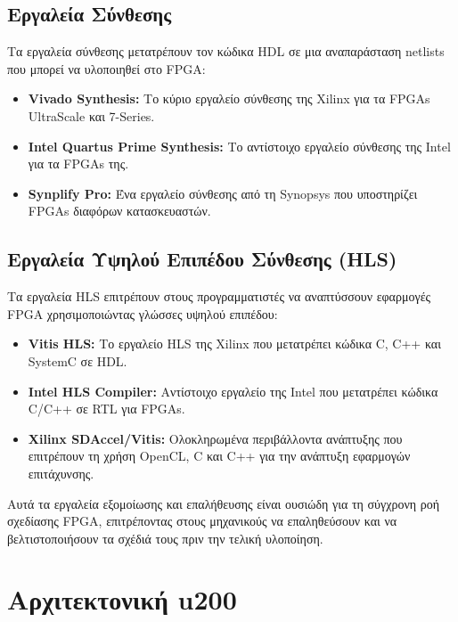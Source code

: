 \subsection{Εργαλεία Σύνθεσης}

Τα εργαλεία σύνθεσης μετατρέπουν τον κώδικα HDL σε μια αναπαράσταση netlists που μπορεί να υλοποιηθεί στο FPGA:

\begin{itemize}
  \item \textbf{Vivado Synthesis:} Το κύριο εργαλείο σύνθεσης της Xilinx για τα FPGAs UltraScale και 7-Series.
  
  \item \textbf{Intel Quartus Prime Synthesis:} Το αντίστοιχο εργαλείο σύνθεσης της Intel για τα FPGAs της.
  
  \item \textbf{Synplify Pro:} Ένα εργαλείο σύνθεσης από τη Synopsys που υποστηρίζει FPGAs διαφόρων κατασκευαστών.
\end{itemize}

\subsection{Εργαλεία Υψηλού Επιπέδου Σύνθεσης (HLS)}

Τα εργαλεία HLS επιτρέπουν στους προγραμματιστές να αναπτύσσουν εφαρμογές FPGA χρησιμοποιώντας γλώσσες υψηλού επιπέδου:

\begin{itemize}
  \item \textbf{Vitis HLS:} Το εργαλείο HLS της Xilinx που μετατρέπει κώδικα C, C++ και SystemC σε HDL.
  
  \item \textbf{Intel HLS Compiler:} Αντίστοιχο εργαλείο της Intel που μετατρέπει κώδικα C/C++ σε RTL για FPGAs.
  
  \item \textbf{Xilinx SDAccel/Vitis:} Ολοκληρωμένα περιβάλλοντα ανάπτυξης που επιτρέπουν τη χρήση OpenCL, C και C++ για την ανάπτυξη εφαρμογών επιτάχυνσης.
\end{itemize}

Αυτά τα εργαλεία εξομοίωσης και επαλήθευσης είναι ουσιώδη για τη σύγχρονη ροή σχεδίασης FPGA, επιτρέποντας στους μηχανικούς να επαληθεύσουν και να βελτιστοποιήσουν τα σχέδιά τους πριν την τελική υλοποίηση.


\section{Αρχιτεκτονική u200}

